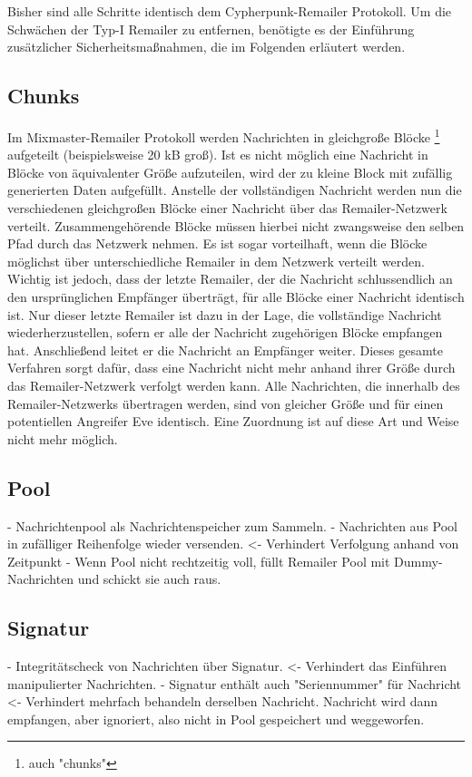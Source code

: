 Bisher sind alle Schritte identisch dem Cypherpunk-Remailer Protokoll. Um die Schwächen der Typ-I Remailer zu entfernen, benötigte es der Einführung zusätzlicher Sicherheitsmaßnahmen, die im Folgenden erläutert werden.

\subsection{Chunks}
Im Mixmaster-Remailer Protokoll werden Nachrichten in gleichgroße Blöcke \footnote{auch "chunks"} aufgeteilt (beispielsweise 20 kB groß). Ist es nicht möglich eine Nachricht in Blöcke von äquivalenter Größe aufzuteilen, wird der zu kleine Block mit zufällig generierten Daten aufgefüllt. Anstelle der vollständigen Nachricht werden nun die verschiedenen gleichgroßen Blöcke einer Nachricht über das Remailer-Netzwerk verteilt. Zusammengehörende Blöcke müssen hierbei nicht zwangsweise den selben Pfad durch das Netzwerk nehmen. Es ist sogar vorteilhaft, wenn die Blöcke möglichst über unterschiedliche Remailer in dem Netzwerk verteilt werden. Wichtig ist jedoch, dass der letzte Remailer, der die Nachricht schlussendlich an den ursprünglichen Empfänger überträgt, für alle Blöcke einer Nachricht identisch ist. Nur dieser letzte Remailer ist dazu in der Lage, die vollständige Nachricht wiederherzustellen, sofern er alle der Nachricht zugehörigen Blöcke empfangen hat. Anschließend leitet er die Nachricht an Empfänger weiter. Dieses gesamte Verfahren sorgt dafür, dass eine Nachricht nicht mehr anhand ihrer Größe durch das Remailer-Netzwerk verfolgt werden kann. Alle Nachrichten, die innerhalb des Remailer-Netzwerks übertragen werden, sind von gleicher Größe und für einen potentiellen Angreifer Eve identisch. Eine Zuordnung ist auf diese Art und Weise nicht mehr möglich.

\subsection{Pool}
- Nachrichtenpool als Nachrichtenspeicher zum Sammeln.
- Nachrichten aus Pool in zufälliger Reihenfolge wieder versenden. <- Verhindert Verfolgung anhand von Zeitpunkt
- Wenn Pool nicht rechtzeitig voll, füllt Remailer Pool mit Dummy-Nachrichten und schickt sie auch raus.

\subsection{Signatur}
- Integritätscheck von Nachrichten über Signatur. <- Verhindert das Einführen manipulierter Nachrichten.
- Signatur enthält auch "Seriennummer" für Nachricht <- Verhindert mehrfach behandeln derselben Nachricht. Nachricht wird dann empfangen, aber ignoriert, also nicht in Pool gespeichert und weggeworfen.

